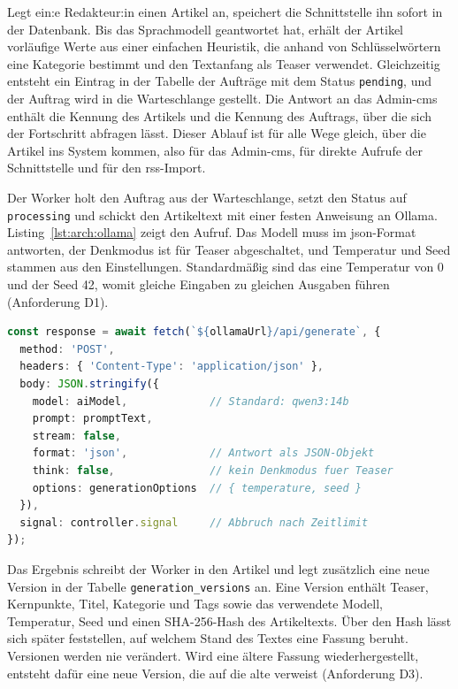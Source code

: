 Legt ein:e Redakteur:in einen Artikel an, speichert die Schnittstelle ihn sofort in der Datenbank.
Bis das Sprachmodell geantwortet hat, erhält der Artikel vorläufige Werte aus einer einfachen Heuristik, die anhand von Schlüsselwörtern eine Kategorie bestimmt und den Textanfang als Teaser verwendet.
Gleichzeitig entsteht ein Eintrag in der Tabelle der Aufträge mit dem Status \texttt{pending}, und der Auftrag wird in die Warteschlange gestellt.
Die Antwort an das Admin-\gls{cms} enthält die Kennung des Artikels und die Kennung des Auftrags, über die sich der Fortschritt abfragen lässt.
Dieser Ablauf ist für alle Wege gleich, über die Artikel ins System kommen, also für das Admin-\gls{cms}, für direkte Aufrufe der Schnittstelle und für den \gls{rss}-Import.

Der Worker holt den Auftrag aus der Warteschlange, setzt den Status auf \texttt{processing} und schickt den Artikeltext mit einer festen Anweisung an Ollama.
Listing~\ref{lst:arch:ollama} zeigt den Aufruf.
Das Modell muss im \gls{json}-Format antworten, der Denkmodus ist für Teaser abgeschaltet, und Temperatur und Seed stammen aus den Einstellungen.
Standardmäßig sind das eine Temperatur von 0 und der Seed 42, womit gleiche Eingaben zu gleichen Ausgaben führen (Anforderung D1).

\begin{lstlisting}[language=TypeScript,caption={Aufruf des Sprachmodells über Ollama (gekürzt aus \texttt{summarizer.ts})},label=lst:arch:ollama]
const response = await fetch(`${ollamaUrl}/api/generate`, {
  method: 'POST',
  headers: { 'Content-Type': 'application/json' },
  body: JSON.stringify({
    model: aiModel,             // Standard: qwen3:14b
    prompt: promptText,
    stream: false,
    format: 'json',             // Antwort als JSON-Objekt
    think: false,               // kein Denkmodus fuer Teaser
    options: generationOptions  // { temperature, seed }
  }),
  signal: controller.signal     // Abbruch nach Zeitlimit
});
\end{lstlisting}

Das Ergebnis schreibt der Worker in den Artikel und legt zusätzlich eine neue Version in der Tabelle \texttt{generation\_versions} an.
Eine Version enthält Teaser, Kernpunkte, Titel, Kategorie und Tags sowie das verwendete Modell, Temperatur, Seed und einen SHA-256-Hash des Artikeltexts.
Über den Hash lässt sich später feststellen, auf welchem Stand des Textes eine Fassung beruht.
Versionen werden nie verändert.
Wird eine ältere Fassung wiederhergestellt, entsteht dafür eine neue Version, die auf die alte verweist (Anforderung D3).

